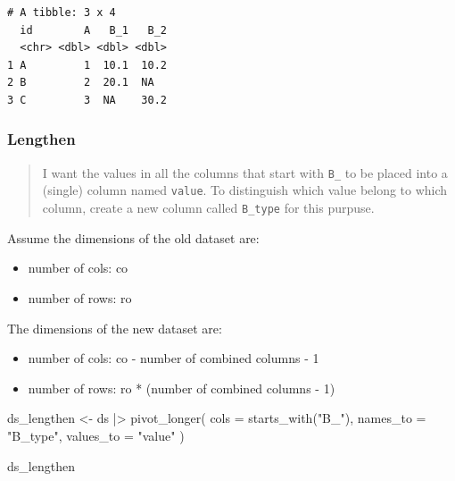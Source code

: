\documentclass[
  letterpaper,
  DIV=11,
  numbers=noendperiod]{scrreprt}
\newenvironment{Shaded}{\begin{snugshade}}{\end{snugshade}}
\newcommand{\AttributeTok}[1]{\textcolor[rgb]{0.40,0.45,0.13}{#1}}
\newcommand{\FunctionTok}[1]{\textcolor[rgb]{0.28,0.35,0.67}{#1}}
\newcommand{\NormalTok}[1]{\textcolor[rgb]{0.00,0.23,0.31}{#1}}
\newcommand{\OtherTok}[1]{\textcolor[rgb]{0.00,0.23,0.31}{#1}}
\newcommand{\SpecialCharTok}[1]{\textcolor[rgb]{0.37,0.37,0.37}{#1}}
\newcommand{\StringTok}[1]{\textcolor[rgb]{0.13,0.47,0.30}{#1}}
\providecommand{\tightlist}{%
  \setlength{\itemsep}{0pt}\setlength{\parskip}{0pt}}\usepackage{longtable,booktabs,array}
\begin{document}
\begin{verbatim}
# A tibble: 3 x 4
  id        A   B_1   B_2
  <chr> <dbl> <dbl> <dbl>
1 A         1  10.1  10.2
2 B         2  20.1  NA  
3 C         3  NA    30.2
\end{verbatim}

\subsubsection{Lengthen}\label{lengthen}

\begin{quote}
I want the values in all the columns that start with \texttt{B\_} to be
placed into a (single) column named \texttt{value}. To distinguish which
value belong to which column, create a new column called
\texttt{B\_type} for this purpuse.
\end{quote}

\begin{tcolorbox}[enhanced jigsaw, opacityback=0, title=\textcolor{quarto-callout-note-color}{\faInfo}\hspace{0.5em}{Dimensions of New Dataset}, colback=white, leftrule=.75mm, colbacktitle=quarto-callout-note-color!10!white, bottomrule=.15mm, colframe=quarto-callout-note-color-frame, arc=.35mm, bottomtitle=1mm, coltitle=black, toptitle=1mm, toprule=.15mm, opacitybacktitle=0.6, rightrule=.15mm, titlerule=0mm, breakable, left=2mm]

Assume the dimensions of the old dataset are:

\begin{itemize}
\tightlist
\item
  number of cols: co
\item
  number of rows: ro
\end{itemize}

The dimensions of the new dataset are:

\begin{itemize}
\tightlist
\item
  number of cols: co - number of combined columns - 1
\item
  number of rows: ro * (number of combined columns - 1)
\end{itemize}

\end{tcolorbox}

\begin{Shaded}
\begin{Highlighting}[]
\NormalTok{ds\_lengthen }\OtherTok{\textless{}{-}}\NormalTok{ ds }\SpecialCharTok{|\textgreater{}} 
  \FunctionTok{pivot\_longer}\NormalTok{(}
    \AttributeTok{cols =} \FunctionTok{starts\_with}\NormalTok{(}\StringTok{"B\_"}\NormalTok{),}
    \AttributeTok{names\_to =} \StringTok{"B\_type"}\NormalTok{,}
    \AttributeTok{values\_to =} \StringTok{"value"}
\NormalTok{  )}

\NormalTok{ds\_lengthen}
\end{Highlighting}
\end{Shaded}
\end{document}
